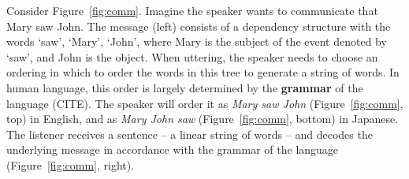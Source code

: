 \documentclass[9pt,twocolumn,twoside,lineno]{pnas-new}
\newcommand{\key}[1]{\textbf{#1}}
\begin{document}
Consider Figure~\ref{fig:comm}.
Imagine the speaker wants to communicate that Mary saw John.
The message (left) consists of a dependency structure with the words `saw', `Mary', `John', where Mary is the subject of the event denoted by `saw', and John is the object.
When uttering, the speaker needs to choose an ordering in which to order the words in this tree to generate a string of words.
In human language, this order is largely determined by the \key{grammar} of the language (CITE).
The speaker will order it as \emph{Mary saw John} (Figure~\ref{fig:comm}, top) in English, and as \emph{Mary John saw} (Figure~\ref{fig:comm}, bottom) in Japanese.
%
%
The listener receives a sentence -- a linear string of words -- and decodes the underlying message in accordance with the grammar of the language (Figure~\ref{fig:comm}, right).

\end{document}
